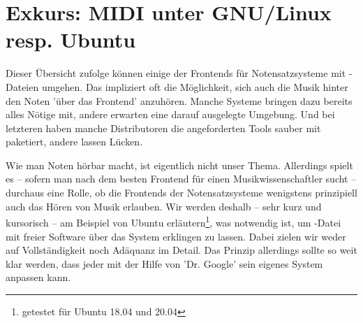 %
%
%


\section{Exkurs: MIDI unter GNU/Linux resp. Ubuntu} \label{MIDI}

Dieser Übersicht zufolge können einige der Frontends für Notensatzsysteme mit -Dateien umgehen. Das impliziert oft die Möglichkeit, sich auch die Musik hinter den Noten 'über das Frontend' anzuhören. Manche Systeme bringen dazu bereits alles Nötige mit, andere erwarten eine darauf ausgelegte Umgebung. Und bei letzteren haben manche Distributoren die angeforderten Tools sauber mit paketiert, andere lassen Lücken.

Wie man Noten hörbar macht, ist eigentlich nicht unser Thema. Allerdings spielt es -- sofern man nach dem besten Frontend für einen Musikwissenschaftler sucht -- durchaus eine Rolle, ob die Frontends der Notensatzsysteme wenigstens prinzipiell auch das Hören von Musik erlauben. Wir werden deshalb -- sehr kurz und kursorisch -- am Beispiel von Ubuntu erläutern\footnote{getestet für Ubuntu 18.04 und 20.04}, was notwendig ist, um -Datei mit freier Software über das System erklingen zu lassen. Dabei zielen wir weder auf Vollständigkeit noch Adäquanz im Detail. Das Prinzip allerdings sollte so weit klar werden, dass jeder mit der Hilfe von 'Dr. Google' sein eigenes System anpassen kann.

